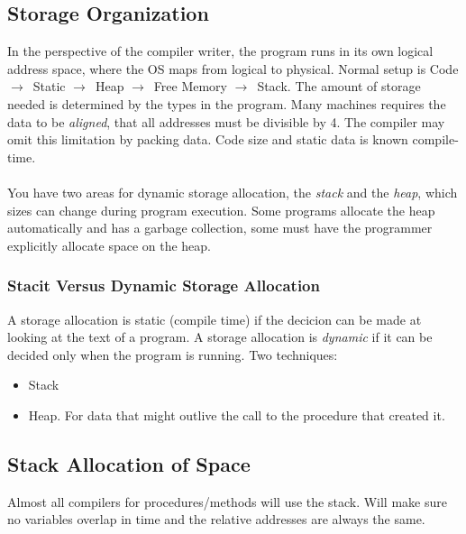 \documentclass{article}
\newcommand{\ta}{$\to$~}
\begin{document}
\subsection{Storage Organization} %
\label{sub:Storage Organization}
In the perspective of the compiler writer, the program runs in its own logical address space, where the OS maps from logical to physical. Normal setup is Code \ta Static \ta Heap \ta Free Memory \ta Stack. The amount of storage needed is determined by the types in the program. Many machines requires the data to be \emph{aligned}, that all addresses must be divisible by 4. The compiler may omit this limitation by packing data. Code size and static data is known compile-time.\\
\\
You have two areas for dynamic storage allocation, the \emph{stack} and the \emph{heap}, which sizes can change during program execution. Some programs allocate the heap automatically and has a garbage collection, some must have the programmer explicitly allocate space on the heap.

\subsubsection{Stacit Versus Dynamic Storage Allocation} %
\label{ssub:Stacit Versus Dynamic Storage Allocation}
A storage allocation is static (compile time) if the decicion can be made at looking at the text of a program. A storage allocation is \emph{dynamic} if it can be decided only when the program is running. Two techniques:
\begin{itemize}
	\item Stack
	\item Heap. For data that might outlive the call to the procedure that created it.
\end{itemize}

\subsection{Stack Allocation of Space} %
\label{sub:Stack Allocation of Space}
Almost all compilers for procedures/methods will use the stack. Will make sure no variables overlap in time and the relative addresses are always the same.
\end{document}
